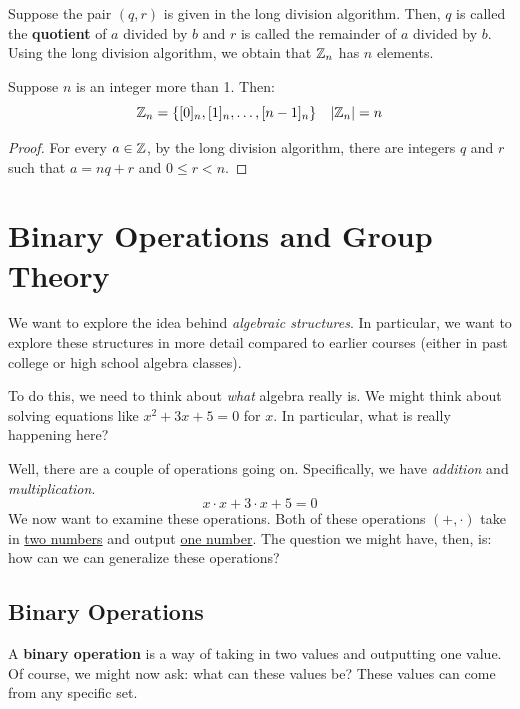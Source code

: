 \documentclass[letterpaper]{article}
\begin{document}
Suppose the pair $(q, r)$ is given in the long division algorithm. Then, $q$ is called the \textbf{quotient} of $a$ divided by $b$ and $r$ is called the remainder of $a$ divided by $b$. Using the long division algorithm, we obtain that $\mathbb{Z}_n$ has $n$ elements. 

\begin{proposition}
    Suppose $n$ is an integer more than 1. Then:
    \[\mathbb{Z}_n = \{[0]_n, [1]_n, \dots, [n - 1]_n\} \quad |\mathbb{Z}_n| = n\]
\end{proposition}
\begin{proof}
    For every $a \in \mathbb{Z}$, by the long division algorithm, there are integers $q$ and $r$ such that $a = nq + r$ and $0 \leq r < n$. 
\end{proof}






\newpage 
\section{Binary Operations and Group Theory}
We want to explore the idea behind \emph{algebraic structures}. In particular, we want to explore these structures in more detail compared to earlier courses (either in past college or high school algebra classes).

\bigskip 

To do this, we need to think about \emph{what} algebra really is. We might think about solving equations like $x^2 + 3x + 5 = 0$ for $x$. In particular, what is really happening here?

\bigskip 

Well, there are a couple of operations going on. Specifically, we have \emph{addition} and \emph{multiplication}. 
\[x \cdot x + 3 \cdot x + 5 = 0\]
We now want to examine these operations. Both of these operations $(+, \cdot)$ take in \underline{two numbers} and output \underline{one number}. The question we might have, then, is: how can we can generalize these operations?

\subsection{Binary Operations}
A \textbf{binary operation} is a way of taking in two values and outputting one value. Of course, we might now ask: what can these values be? These values can come from any specific set. 
\end{document}
